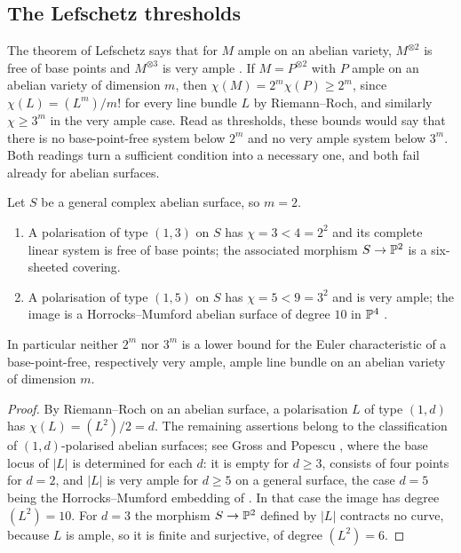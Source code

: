 \subsection{The Lefschetz thresholds}

The theorem of Lefschetz says that for $M$ ample on an abelian variety,
$M^{\otimes2}$ is free of base points and $M^{\otimes3}$ is very ample
\cite[Section~4.5]{BL04}. If $M=P^{\otimes2}$ with $P$ ample on an abelian
variety of dimension $m$, then $\chi(M)=2^{m}\chi(P)\ge2^{m}$, since
$\chi(L)=(L^{m})/m!$ for every line bundle $L$ by Riemann--Roch, and similarly
$\chi\ge3^{m}$ in the very ample case. Read as thresholds, these bounds would
say that there is no base-point-free system below $2^{m}$ and no very ample
system below $3^{m}$. Both readings turn a sufficient condition into a
necessary one, and both fail already for abelian surfaces.

\begin{proposition}\label{prop:thresholds}
Let $S$ be a general complex abelian surface, so $m=2$.
\begin{enumerate}[label=\textup{(\roman*)},nosep]
\item A polarisation of type $(1,3)$ on $S$ has $\chi=3<4=2^{2}$ and its
  complete linear system is free of base points; the associated morphism
  $S\to\mathbb{P}^{2}$ is a six-sheeted covering.
\item A polarisation of type $(1,5)$ on $S$ has $\chi=5<9=3^{2}$ and is very
  ample; the image is a Horrocks--Mumford abelian surface of degree $10$ in
  $\mathbb{P}^{4}$ \textup{\cite{HM73}}.
\end{enumerate}
In particular neither $2^{m}$ nor $3^{m}$ is a lower bound for the Euler
characteristic of a base-point-free, respectively very ample, ample line
bundle on an abelian variety of dimension $m$.
\end{proposition}

\begin{proof}
By Riemann--Roch on an abelian surface, a polarisation $L$ of type $(1,d)$
has $\chi(L)=(L^{2})/2=d$. The remaining assertions belong to the
classification of $(1,d)$-polarised abelian surfaces; see Gross and Popescu
\cite[\S1.2]{GP98}, where the base locus of $|L|$ is determined for each $d$:
it is empty for $d\ge3$, consists of four points for $d=2$, and $|L|$ is very
ample for $d\ge5$ on a general surface, the case $d=5$ being the
Horrocks--Mumford embedding of \cite{HM73}. In that case the image has degree
$(L^{2})=10$. For $d=3$ the morphism $S\to\mathbb{P}^{2}$ defined by $|L|$ contracts
no curve, because $L$ is ample, so it is finite and surjective, of degree
$(L^{2})=6$.
\end{proof}


